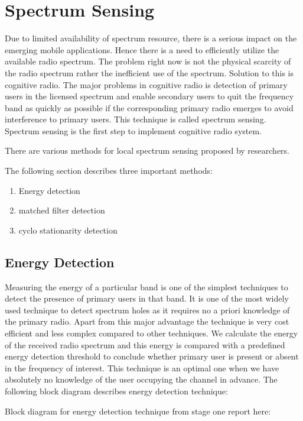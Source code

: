 \chapter{Spectrum Sensing}

Due to limited availability of spectrum resource, there is a serious impact on 
the emerging mobile applications. Hence there is a need to efficiently utilize
the available radio spectrum. The problem right now is not the physical scarcity
of the radio spectrum rather the inefficient use of the spectrum. Solution to 
this is cognitive radio. The major problems in cognitive radio is detection of 
primary users in the licensed spectrum and enable secondary users to quit the 
frequency band as quickly as possible if the corresponding primary radio emerges
to avoid interference to primary users. This technique is called spectrum 
sensing. Spectrum sensing is the first step to implement cognitive radio system.

There are various methods for local spectrum sensing proposed by researchers.

The following section describes three important methods:
\begin{enumerate}
	\item Energy detection
	\item matched filter detection 
	\item cyclo stationarity detection
\end{enumerate}

\section{Energy Detection}

Measuring the energy of a particular band is one of the simplest techniques to 
detect the presence of primary users in that band. It is one of the most widely
used technique to detect spectrum holes as it requires no a priori knowledge of 
the primary radio. Apart from this major advantage the technique is very cost 
efficient and less complex compared to other techniques. 
We calculate the energy of the received radio spectrum and this energy is 
compared with a predefined energy detection threshold to conclude whether 
primary user is present or absent in the frequency of interest. This technique 
is an optimal one when we have absolutely no knowledge of the user occupying the
channel in advance. The following block diagram describes energy detection 
technique:

Block diagram for energy detection technique from stage one report here:


